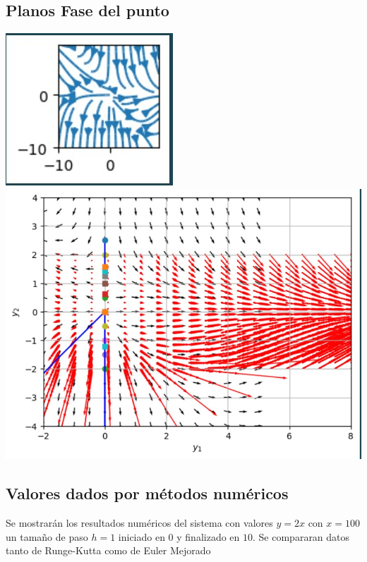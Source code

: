 \documentclass{article}
\begin{document}
         \subsection*{Planos Fase del punto }
       \noindent
         \includegraphics{isoclinas d=-2 a=1.jpg}
          \includegraphics{vecotrial d=-2 a=1.jpg}

      \subsection*{Valores dados por métodos numéricos}
         Se mostrarán los resultados numéricos del sistema con valores $y=2x$
         con $x=100$ un tamaño de paso $h=1$ iniciado en $0$ y finalizado en $10$.
         Se compararan datos tanto de Runge-Kutta como de Euler Mejorado
\end{document}
